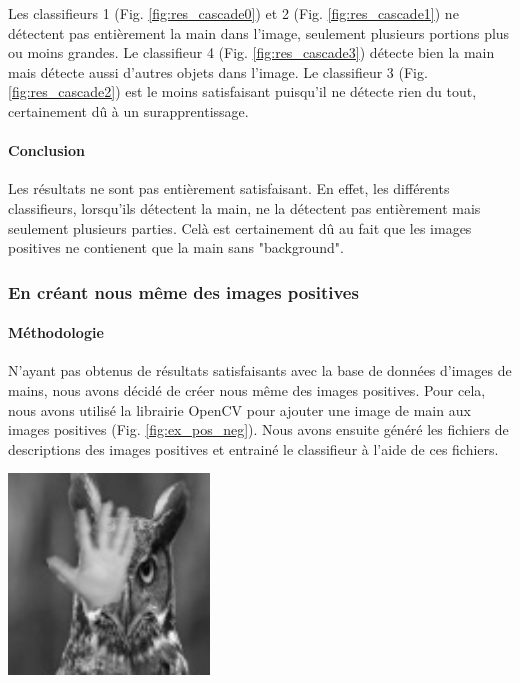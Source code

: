 \documentclass[11pt]{article}
\begin{document}
\bigbreak

Les classifieurs 1 (Fig. \ref{fig:res_cascade0}) et 2 (Fig. \ref{fig:res_cascade1}) ne détectent pas entièrement la main dans l'image, seulement plusieurs portions plus ou moins grandes. Le classifieur 4 (Fig. \ref{fig:res_cascade3}) détecte bien la main mais détecte aussi d'autres objets dans l'image. Le classifieur 3 (Fig. \ref{fig:res_cascade2}) est le moins satisfaisant puisqu'il ne détecte rien du tout, certainement dû à un surapprentissage.

\paragraph{Conclusion}
Les résultats ne sont pas entièrement satisfaisant. En effet, les différents classifieurs, lorsqu'ils détectent la main, ne la détectent pas entièrement mais seulement plusieurs parties. Celà est certainement dû au fait que les images positives ne contienent que la main sans "background". 

\subsubsection{En créant nous même des images positives}
\paragraph{Méthodologie}
N'ayant pas obtenus de résultats satisfaisants avec la base de données d'images de mains, nous avons décidé de créer nous même des images positives. Pour cela, nous avons utilisé la librairie OpenCV pour ajouter une image de main aux images positives (Fig. \ref{fig:ex_pos_neg}). Nous avons ensuite généré les fichiers de descriptions des images positives et entrainé le classifieur à l'aide de ces fichiers. \bigbreak

\begin{center}
    \includegraphics[width=0.4\textwidth]{images/ex_pos_neg.jpg}
    \label{fig:ex_pos_neg}
\end{center}
\end{document}
